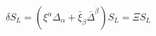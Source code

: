 \begin{equation} 
\delta S_{L} = (\xi^{\alpha} \Delta_{\alpha} + \bar{\xi}_{\dot{\beta}} 
\bar{\Delta}^{\dot{\beta}}) S_{L} = \Xi S_{L}    \label{eq:pib} 
\end{equation} 
